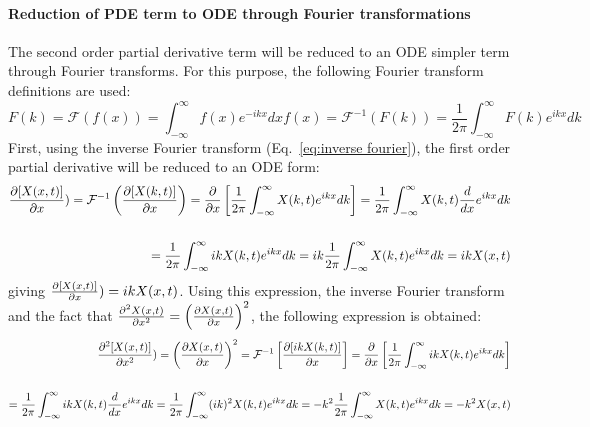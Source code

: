 \paragraph{Reduction of PDE term to ODE through Fourier transformations}
The second order partial derivative term will be reduced to an ODE simpler term through Fourier transforms. For this purpose, the following Fourier transform definitions are used:
\begin{subequations}
    \begin{equation}
        F(k) = \mathcal{F}(f(x)) = \int_{-\infty}^{\infty} f(x)e^{-ikx} dx
    \end{equation}
    \begin{equation}
        f(x) = \mathcal{F}^{-1}(F(k)) = \frac{1}{2\pi}\int_{-\infty}^{\infty} F(k)e^{ikx} dk
        \label{eq:inverse fourier}
    \end{equation}
\end{subequations}
First, using the inverse Fourier transform (Eq.~\ref{eq:inverse fourier}), the first order partial derivative will be reduced to an ODE form:
\begin{equation}
    \begin{split}
        \pdv{[X(x,t)]}{x}) = \mathcal{F}^{-1}\left(\pdv{[X(k,t)]}{x}\right) = \frac{\partial}{\partial x}\left[\frac{1}{2\pi}\int_{-\infty}^{\infty} X(k,t)e^{ikx} dk\right] =  \frac{1}{2\pi}\int_{-\infty}^{\infty} X(k,t)\frac{d}{dx}e^{ikx} dk\\\\ =\frac{1}{2\pi}\int_{-\infty}^{\infty} ik X(k,t)e^{ikx} dk = ik \frac{1}{2\pi}\int_{-\infty}^{\infty} X(k,t)e^{ikx} dk = ik X(x,t)
    \end{split}
\end{equation}
giving $\pdv{[X(x,t)]}{x}) =  ik X(x,t)$.
Using this expression, the inverse Fourier transform and the fact that $\frac{\partial^{2} {X(x,t)}}{\partial {x}^{2}} =\left(\pdv{X(x,t)}{x}\right)^2$, the following expression is obtained:
\begin{equation}
    \begin{split}
        \frac{\partial^{2} {[X(x,t)]}}{\partial {x}^{2}}) = \left(\pdv{X(x,t)}{x}\right)^2 = \mathcal{F}^{-1}\left[\pdv{[ikX(k,t)]}{x}\right] = \frac{\partial}{\partial x}\left[\frac{1}{2\pi}\int_{-\infty}^{\infty} ikX(k,t)e^{ikx} dk\right] \\\\=  \frac{1}{2\pi}\int_{-\infty}^{\infty} ikX(k,t)\frac{d}{dx}e^{ikx} dk =\frac{1}{2\pi}\int_{-\infty}^{\infty} (ik)^2 X(k,t)e^{ikx} dk = -k^2 \frac{1}{2\pi}\int_{-\infty}^{\infty} X(k,t)e^{ikx} dk = -k^2 X(x,t)
    \end{split}
    \label{eq:fourier of our system}
\end{equation}
